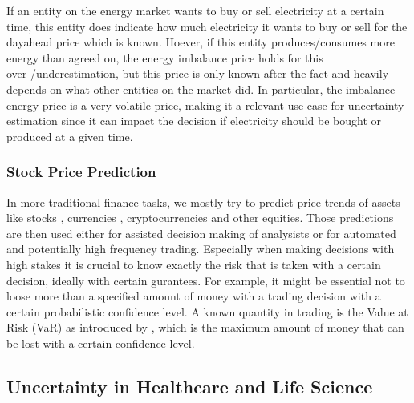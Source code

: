 If an entity on the energy market wants to buy or sell electricity at a certain time, this entity does indicate how much electricity it wants to buy or sell for the dayahead price which is known. Hoever, if this entity produces/consumes more energy than agreed on, the energy imbalance price holds for this over-/underestimation, but this price is only known after the fact and heavily depends on what other entities on the market did. In particular, the imbalance energy price is a very volatile price, making it a relevant use case for uncertainty estimation since it can impact the decision if electricity should be bought or produced at a given time.

\subsubsection{Stock Price Prediction}
In more traditional finance tasks, we mostly try to predict price-trends of assets like stocks \cite{singh2017stock}, currencies \cite{hassanpour2023evaluation}, cryptocurrencies \cite{alessandretti2018anticipating} and other equities. Those predictions are then used either for assisted decision making of analysists or for automated and potentially high frequency trading. Especially when making decisions with high stakes it is crucial to know exactly the risk that is taken with a certain decision, ideally with certain gurantees. For example, it might be essential not to loose more than a specified amount of money with a trading decision with a certain probabilistic confidence level. A known quantity in trading is the Value at Risk (VaR) as introduced by \cite{jorion2007value}, which is the maximum amount of money that can be lost with a certain confidence level.

\subsection{Uncertainty in Healthcare and Life Science}

